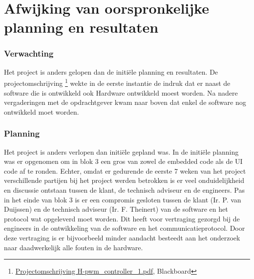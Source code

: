 \section{Afwijking van oorspronkelijke planning en resultaten}
\subsubsection{Verwachting}
Het project is anders gelopen dan de initiële planning en resultaten. De projectomschrijving \footnote{\href{https://blackboard.hhs.nl/webapps/blackboard/execute/content/file?cmd=view&content_id=_2697384_1&course_id=_73453_1&framesetWrapped=true}{Projectomschrijving H-pwm\_controller\_1.pdf}, Blackboard} wekte in de eerste instantie de indruk dat er naast de software die is ontwikkeld ook Hardware ontwikkeld moest worden. Na nadere vergaderingen met de opdrachtgever kwam naar boven dat enkel de software nog ontwikkeld moet worden. 

\subsubsection{Planning}
Het project is anders verlopen dan initiële gepland was. In de initiële planning was er opgenomen om in blok 3 een gros van zowel de embedded code als de UI code af te ronden. Echter, omdat er gedurende de eerste 7 weken van het project verschillende partijen bij het project werden betrokken is er veel onduidelijkheid en discussie ontstaan tussen de klant, de technisch adviseur en de engineers. Pas in het einde van blok 3 is er een compromis gesloten tussen de klant (Ir. P. van Duijssen) en de technisch adviseur (Ir. F. Theinert) van de software en het protocol wat opgeleverd moet worden. Dit heeft voor vertraging gezorgd bij de engineers in de ontwikkeling van de software en het communicatieprotocol. Door deze vertraging is er bijvoorbeeld minder aandacht besteedt aan het onderzoek naar daadwerkelijk alle fouten in de hardware.

